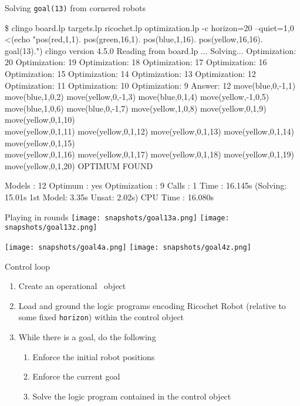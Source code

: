 \begin{frame}{Solving \lstinline{goal(13)} from cornered robots}
\tiny\vspace{-5pt}
\begin{semiverbatim}
\$ clingo board.lp targets.lp ricochet.lp optimization.lp -c horizon=20 --quiet=1,0 \\
        <(echo "pos(red,1,1). pos(green,16,1). pos(blue,1,16). pos(yellow,16,16).   goal(13).")\pause
clingo version 4.5.0
Reading from board.lp ...
Solving...
Optimization: 20
Optimization: 19
Optimization: 18
Optimization: 17
Optimization: 16
Optimization: 15
Optimization: 14
Optimization: 13
Optimization: 12
Optimization: 11
Optimization: 10
Optimization: 9
Answer: 12
\alert<2>{move(blue,0,-1,1)   move(blue,1,0,2)    move(yellow,0,-1,3) move(blue,0,1,4)    move(yellow,-1,0,5) \\
move(blue,1,0,6)    move(blue,0,-1,7)   move(yellow,1,0,8)  move(yellow,0,1,9)}  move(yellow,0,1,10) \\
move(yellow,0,1,11) move(yellow,0,1,12) move(yellow,0,1,13) move(yellow,0,1,14) move(yellow,0,1,15) \\
move(yellow,0,1,16) move(yellow,0,1,17) move(yellow,0,1,18) move(yellow,0,1,19) move(yellow,0,1,20)
OPTIMUM FOUND

Models       : 12
  Optimum    : yes
Optimization : 9
Calls        : 1
Time         : 16.145s (Solving: 15.01s 1st Model: 3.35s Unsat: 2.02s)
CPU Time     : 16.080s
\end{semiverbatim}
\end{frame}
\begin{frame}[c]{Playing in rounds}
   \qquad
  \texttt{[image: snapshots/goal13a.png]}
  \qquad
  \texttt{[image: snapshots/goal13z.png]}
  \par\bigskip
   \qquad
  \texttt{[image: snapshots/goal4a.png]}
  \qquad
  \texttt{[image: snapshots/goal4z.png]}
\end{frame}
\begin{frame}[c]{Control loop}
\begin{enumerate}
\item Create an operational \clingo\ object
\smallskip
\item Load and ground the logic programs encoding Ricochet Robot
  (relative to some fixed \lstinline{horizon})
  within the control object
\smallskip
\item While there is a goal, do the following
  \begin{enumerate}\normalsize
  \item Enforce the initial robot positions
  \item Enforce the current goal
  \item Solve the logic program contained in the control object
  \end{enumerate}
\end{enumerate}
\bigskip
\end{frame}
